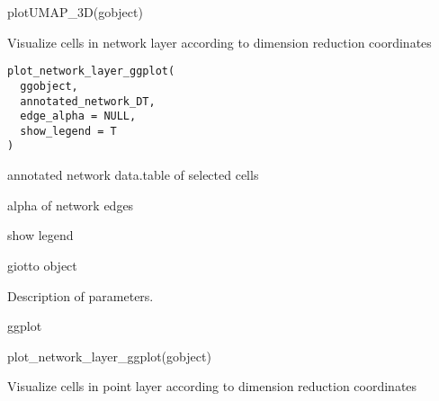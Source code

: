 \documentclass[a4paper]{book}
\begin{document}
%
\begin{Examples}
\begin{ExampleCode}
    plotUMAP_3D(gobject)

\end{ExampleCode}
\end{Examples}
%
\begin{Description}\relax
Visualize cells in network layer according to dimension reduction coordinates
\end{Description}
%
\begin{Usage}
\begin{verbatim}
plot_network_layer_ggplot(
  ggobject,
  annotated_network_DT,
  edge_alpha = NULL,
  show_legend = T
)
\end{verbatim}
\end{Usage}
%
\begin{Arguments}
\begin{ldescription}
\item[\code{annotated\_network\_DT}] annotated network data.table of selected cells

\item[\code{edge\_alpha}] alpha of network edges

\item[\code{show\_legend}] show legend

\item[\code{gobject}] giotto object
\end{ldescription}
\end{Arguments}
%
\begin{Details}\relax
Description of parameters.
\end{Details}
%
\begin{Value}
ggplot
\end{Value}
%
\begin{Examples}
\begin{ExampleCode}
    plot_network_layer_ggplot(gobject)
\end{ExampleCode}
\end{Examples}
%
\begin{Description}\relax
Visualize cells in point layer according to dimension reduction coordinates
\end{Description}
%
\end{document}
